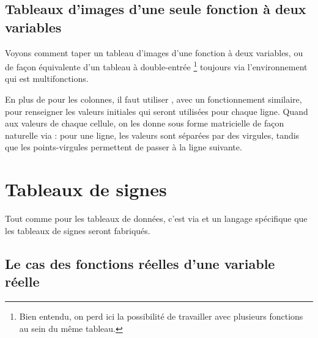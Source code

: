 \documentclass[10pt, a4paper]{article}
\begin{document}

\subsection{Tableaux d'images d'une seule fonction à deux variables}

Voyons comment taper un tableau d'images d'une fonction à deux variables, ou de façon équivalente d'un tableau à double-entrée
\footnote{
	Bien entendu, on perd ici la possibilité de travailler avec plusieurs fonctions au sein du même tableau.
}
toujours via l'environnement  qui est multifonctions.




\begin{tdocexa}
    En plus de  pour les colonnes, il faut utiliser , avec un fonctionnement similaire, pour renseigner les valeurs initiales qui seront utilisées pour chaque ligne.
    Quand aux valeurs de chaque cellule, on les donne sous forme matricielle de façon naturelle via  : pour une ligne, les valeurs sont séparées par des virgules, tandis que les points-virgules permettent de passer à la ligne suivante.

\end{tdocexa}




\begin{tdocexa}
    \leavevmode

\end{tdocexa}


\section{Tableaux de signes}

\begin{tdocnote}
	Tout comme pour les tableaux de données, c'est via  et un langage spécifique que les tableaux de signes seront fabriqués.
\end{tdocnote}




\subsection{Le cas des fonctions réelles d'une variable réelle}
\end{document}
